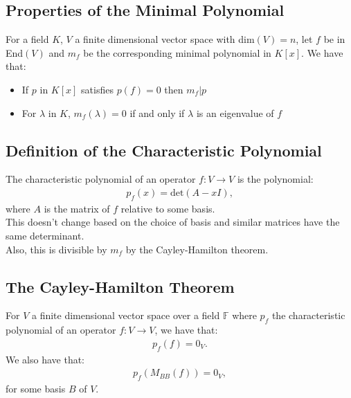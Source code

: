 \documentclass[a4paper, 12pt, twoside]{article}
\begin{document}
\subsection{Properties of the Minimal Polynomial}

For a field $K$, $V$ a finite dimensional vector space with dim$(V) = n$, let $f$ be in
End$(V)$ and $m_f$ be the corresponding minimal polynomial in $K[x]$.
We have that: \begin{itemize}
  \item If $p$ in $K[x]$ satisfies $p(f) = 0$ then $m_f | p$
  \item For $\lambda$ in $K$, $m_f(\lambda) = 0$ if and only if 
  $\lambda$ is an eigenvalue of $f$
\end{itemize}

\newpage

\subsection{Definition of the Characteristic Polynomial}

The characteristic polynomial of an operator $f : V \to V$ is the polynomial: \begin{gather*}
  p_f(x) = \text{det}(A - xI),
\end{gather*} where $A$ is the matrix of $f$ relative to some basis.
\\[\baselineskip]
This doesn't change based on the choice of basis and similar matrices have the same determinant.
\\[\baselineskip]
Also, this is divisible by $m_f$ by the Cayley-Hamilton theorem.

\subsection{The Cayley-Hamilton Theorem}

For $V$ a finite dimensional vector space over a field $\mathbb{F}$ where 
$p_f$ the characteristic polynomial of an operator $f : V \to V$, we have that: \begin{gather*}
  p_f(f) = 0_V.
\end{gather*} We also have that: \begin{gather*}
  p_f(M_{BB}(f)) = 0_V,
\end{gather*} for some basis $B$ of $V$.
\end{document}
